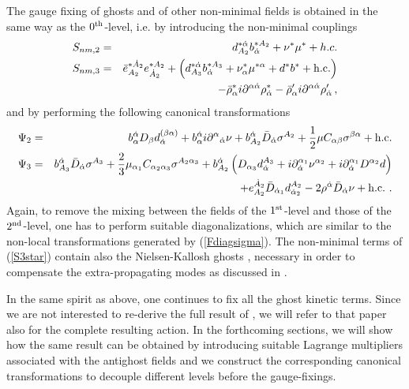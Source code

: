 \documentclass[a4paper,12pt]{article}
\begin{document}
The gauge fixing of ghosts and of other non-minimal fields is
obtained in the same way as the $0^{\rm th}$-level, i.e. by introducing the
non-minimal couplings
\begin{eqnarray}\label{S3star}
S_{nm,2}&=&
d^{*\dot \alpha}_{A_2}b^{*A_2}_{\dot \alpha}+
\nu^*\mu^* + h.c.\nonumber\\
S_{nm,3}&=& \bar e^{*\dot A_2}_{A_2}
e_{\dot A_2 }^{*A_2} +
\left( d^{*\dot \alpha}_{A_3}b^{*A_3}_{\dot \alpha}+
  \nu^*_\alpha \mu^{*\alpha}+d^*b^*+ {\rm h.c.}\right) \nonumber\\
&&-\bar \rho^*_\alpha i\partial^{\alpha\dot \alpha} \rho^*_{\dot \alpha}
-\bar \rho'_\alpha i\partial^{\alpha\dot \alpha}\rho'_{\dot \alpha} \, , 
\end{eqnarray}
and by performing the following canonical transformations 
\begin{eqnarray}
  \Psi_2&=&b_\alpha^{\dot \alpha}
  D_\beta d^{(\beta\alpha)}_{\dot \alpha}+b_\alpha^{\dot \alpha}
  i\partial^\alpha{}_{\dot
    \alpha}\nu
  +b_{A_2}^{\dot \alpha}\bar D_{\dot
    \alpha}\sigma^{A_2}
  +{1 \over 2}\mu C_{\alpha\beta}\sigma^{\beta\alpha} +{\rm h.c.} 
  \nonumber \\
  \Psi_3&=&b^{\dot \alpha}_{A_3}\bar D_{\dot \alpha}
  \sigma^{A_3}+{2 \over 3}\mu_{\alpha_1} C_{\alpha_2\alpha_3}
  \sigma^{A_2\alpha_3}+b^{\dot \alpha}_{A_2}\left(
    D_{\alpha_3} d_{\dot \alpha}^{A_3} +i\partial_{\dot \alpha}
    ^{\alpha_1} \nu^{\alpha_2}+ i\partial^{\alpha_1}_{\dot \alpha}
    D^{\alpha_2} d\right) \nonumber\\
  && +e_{A_2}^{\dot A_2}\bar D_{\dot \alpha_1}
  d_{\dot \alpha_2}^{A_2}
  -2 \rho^{\dot \alpha}\bar D_{\dot \alpha}\nu   + {\rm h.c.}
  \ . 
\end{eqnarray}
Again, to remove the mixing between the fields of the $1^{\rm st}$-level 
and those of the $2^{\rm nd}$-level, one has to perform
suitable diagonalizations, which are similar to the non-local
transformations generated by (\ref{Fdiagsigma}). The non-minimal terms
of (\ref{S3star}) contain also the Nielsen-Kallosh ghosts \cite{NKgh}, 
necessary in order to compensate the extra-propagating modes as discussed in
\cite{GPZ}.

In the same spirit as above, one continues to fix all the ghost kinetic
terms.  Since we are not interested to re-derive the full result of
\cite{GPZ}, we will refer to that paper also for the complete
resulting action.  In the forthcoming sections, we will show how the
same result can be obtained by introducing suitable Lagrange
multipliers associated with the antighost fields and we construct the
corresponding canonical transformations to decouple different levels
before the gauge-fixings.
\end{document}
